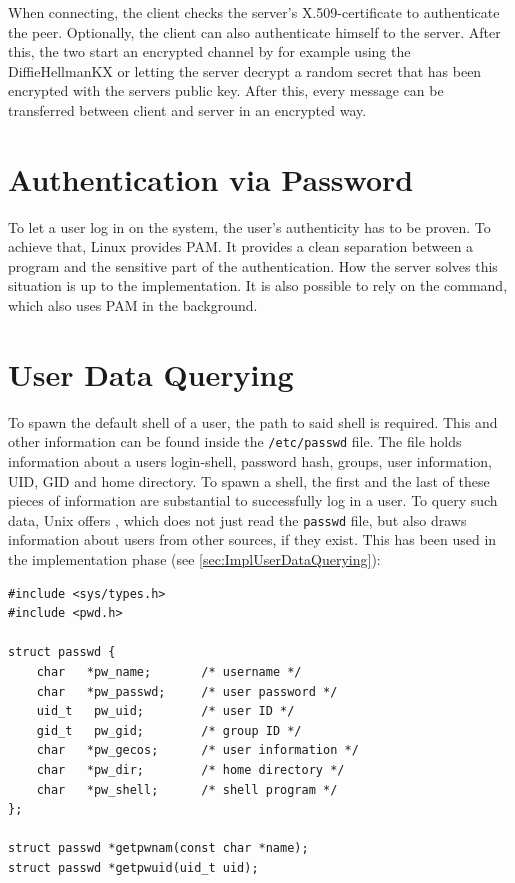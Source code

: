 \documentclass[10pt,a4paper,titlepage,twoside,english,final]{zhawreprt}
\begin{document}
When connecting, the client checks the server's \gls{X.509}-certificate to authenticate the peer.
Optionally, the client can also authenticate himself to the server.
After this, the two start an encrypted channel by for example using the \gls{DiffieHellmanKX} or letting the server decrypt a random secret that has been encrypted with the servers public key.
After this, every message can be transferred between client and server in an encrypted way.

\section{Authentication via Password}\label{sec:DesignAuthViaPw}
To let a user log in on the system, the user's authenticity has to be proven.
To achieve that, \gls{Linux} provides \gls{PAM}.
It provides a clean separation between a program and the sensitive part of the authentication.
How the server solves this situation is up to the implementation.
It is also possible to rely on the \cite{login} command, which also uses \gls{PAM} in the background.

\section{User Data Querying}\label{sec:DesignUserDataQuerying}
To spawn the default \gls{shell} of a user, the path to said \gls{shell} is required.
This and other information can be found inside the \texttt{/etc/passwd} file.
The file holds information about a users \gls{login}-\gls{shell}, password hash, groups, user information, \gls{UID}, \gls{GID} and home directory.
To spawn a \gls{shell}, the first and the last of these pieces of information are substantial to successfully log in a user.
To query such data, \gls{Unix} offers \cite{getpw}, which does not just read the \texttt{passwd} file, but also draws information about users from other sources, if they exist.
This has been used in the implementation phase (see \ref{sec:ImplUserDataQuerying}):
\setlistingC
\begin{lstlisting}[caption={Definition of passwd and {\cite{getpw}}},label=lst:PasswdDefinition]
#include <sys/types.h>
#include <pwd.h>

struct passwd {
	char   *pw_name;       /* username */
	char   *pw_passwd;     /* user password */
	uid_t   pw_uid;        /* user ID */
	gid_t   pw_gid;        /* group ID */
	char   *pw_gecos;      /* user information */
	char   *pw_dir;        /* home directory */
	char   *pw_shell;      /* shell program */
};

struct passwd *getpwnam(const char *name);
struct passwd *getpwuid(uid_t uid);
\end{lstlisting}
\end{document}

